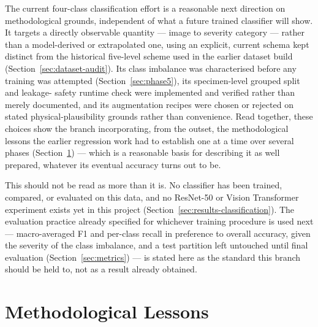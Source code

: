 The current four-class classification effort is a reasonable next
direction on methodological grounds, independent of what a future trained
classifier will show. It targets a directly observable quantity — image to
severity category — rather than a model-derived or extrapolated one,
using an explicit, current schema kept distinct from the historical
five-level scheme used in the earlier dataset build
(Section~\ref{sec:dataset-audit}). Its
class imbalance was characterised before any training was attempted
(Section~\ref{sec:phase5}), its specimen-level grouped split and leakage-
safety runtime check were implemented and verified rather than merely
documented, and its augmentation recipes were chosen or rejected on stated
physical-plausibility grounds rather than convenience. Read together,
these choices show the branch incorporating, from the outset, the
methodological lessons the earlier regression work had to establish
one at a time over several phases (Section~\ref{sec:interp-lessons}) —
which is a reasonable basis for describing it as well prepared, whatever
its eventual accuracy turns out to be.

This should not be read as more than it is. No classifier has been
trained, compared, or evaluated on this data, and no ResNet-50 or Vision
Transformer experiment exists yet in this project
(Section~\ref{sec:results-classification}). The evaluation practice
already specified for whichever training procedure is used next —
macro-averaged F1 and per-class recall in preference to overall accuracy,
given the severity of the class imbalance, and a test partition left
untouched until final evaluation (Section~\ref{sec:metrics}) — is stated
here as the standard this branch should be held to, not as a result
already obtained.

\section{Methodological Lessons}
\label{sec:interp-lessons}

